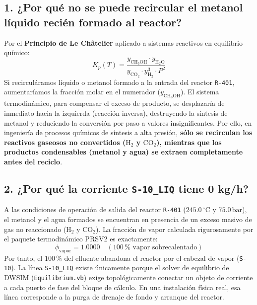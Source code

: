 \documentclass[11pt,a4paper]{article}
\begin{document}
\subsection{1. ¿Por qué no se puede recircular el metanol líquido recién formado al reactor?}
Por el \textbf{Principio de Le Châtelier} aplicado a sistemas reactivos en equilibrio químico:
\begin{equation}
    K_p(T) = \frac{y_{\text{CH}_3\text{OH}} \cdot y_{\text{H}_2\text{O}}}{y_{\text{CO}_2} \cdot y_{\text{H}_2}^3 \cdot P^2}
\end{equation}
Si recirculáramos líquido o metanol formado a la entrada del reactor \texttt{R-401}, aumentaríamos la fracción molar en el numerador ($y_{\text{CH}_3\text{OH}}$). El sistema termodinámico, para compensar el exceso de producto, se desplazaría de inmediato hacia la izquierda (reacción inversa), destruyendo la síntesis de metanol y reduciendo la conversión por paso a valores insignificantes. Por ello, en ingeniería de procesos químicos de síntesis a alta presión, \textbf{sólo se recirculan los reactivos gaseosos no convertidos ($\text{H}_2$ y $\text{CO}_2$), mientras que los productos condensables (metanol y agua) se extraen completamente antes del reciclo}.

\subsection{2. ¿Por qué la corriente \texttt{S-10\_LIQ} tiene 0 kg/h?}
A las condiciones de operación de salida del reactor \texttt{R-401} ($245.0\,^\circ\text{C}$ y $75.0\,\text{bar}$), el metanol y el agua formados se encuentran en presencia de un exceso masivo de gas no reaccionado ($\text{H}_2$ y $\text{CO}_2$). La fracción de vapor calculada rigurosamente por el paquete termodinámico PRSV2 es exactamente:
\begin{equation}
    \phi_{\text{vapor}} = 1.0000 \quad (100\,\% \text{ vapor sobrecalentado})
\end{equation}
Por tanto, el $100\,\%$ del efluente abandona el reactor por el cabezal de vapor (\texttt{S-10}). La línea \texttt{S-10\_LIQ} existe únicamente porque el solver de equilibrio de DWSIM (\texttt{Equilibrium.vb}) exige topológicamente conectar un objeto de corriente a cada puerto de fase del bloque de cálculo. En una instalación física real, esa línea corresponde a la purga de drenaje de fondo y arranque del reactor.
\end{document}
